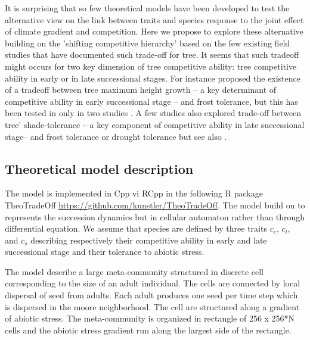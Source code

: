 \documentclass[a4paper,11pt]{article}
\begin{document}
It is surprising that so few theoretical models have been developed to test the alternative view on the link between traits and species response to the joint effect of climate gradient and competition.
Here we propose to explore these alternative building on the 'shifting competitive hierarchy' based on the few existing field studies that have documented such trade-off for tree. It seems that such tradeoff might occurs for two key dimension of tree competitive ability: tree competitive ability in early or in late successional stages. For instance \citep{Loehle-1998} proposed the existence of a tradeoff between tree maximum height growth – a key determinant of competitive ability in early successional stage – and frost tolerance, but this has been tested in only in two studies \citep{Koehler-2012,Savage-2013}. A few studies also explored trade-off between tree’ shade-tolerance -–a key component of competitive ability in late successional stage-- and frost tolerance \citep{Lusk-2013} or drought tolerance \citep[see][]{Smith-1989,Niinemets-2006} but see also \citep{Sack-2004,Markesteijn-2011}.


\subsection{Theoretical model description}

The model is implemented in Cpp vi RCpp in the following R package
TheoTradeOff \url{https://github.com/kunstler/TheoTradeOff}. The
model build on \citet{Pacala-1998} to represents the succession
dynamics but in cellular automaton rather than through
differential equation. We assume that species are defined by three
traits $c_e$, $c_l$, and $c_s$ describing
respectively their competitive ability in early and late successional stage and their
tolerance to abiotic stress.

The model describe a large meta-community structured in discrete cell
corresponding  to the  size of  an  adult individual.   The cells  are
connected  by local  dispersal  of  seed from  adults. Each adult
produces one seed per time step which is dispersed in the moore
neighborhood.  The cell  are structured along a  gradient of
abiotic stress. The meta-community is organized in rectangle of
256 x 256*N cells  and the abiotic stress  gradient run along the
largest side of the rectangle.
\end{document}
